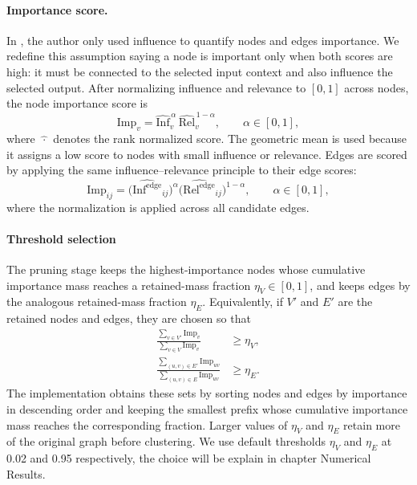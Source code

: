 \documentclass[../main.tex]{subfiles}
\begin{document}
\paragraph{Importance score.}
In \cite{ameisen2025circuit}, the author only used influence to quantify nodes and edges importance. We redefine this assumption saying a node is important only when both scores are high: it must be connected to the
selected input context and also influence the selected output. After normalizing
influence and relevance to $[0,1]$ across nodes, the node importance score is
\begin{equation}
\mathrm{Imp}_v =
\widehat{\mathrm{Inf}}_v^{\,\alpha}\,
\widehat{\mathrm{Rel}}_v^{\,1-\alpha},
\qquad \alpha \in [0,1],
\label{eq:importance}
\end{equation}
where $\widehat{\,\cdot\,}$ denotes the rank normalized score. The geometric mean is
used because it assigns a low score to nodes with small influence or relevance.
Edges are scored by applying the
same influence--relevance principle to their edge scores:
\begin{equation}
\mathrm{Imp}_{ij} =
\bigl(\widehat{\mathrm{Inf}^{\text{edge}}}_{ij}\bigr)^{\alpha}
\bigl(\widehat{\mathrm{Rel}^{\text{edge}}}_{ij}\bigr)^{1-\alpha},
\qquad \alpha \in [0,1],
\label{eq:edge-importance}
\end{equation}
where the normalization is applied across all candidate edges.

\paragraph{Threshold selection}
The pruning stage keeps the highest-importance nodes whose cumulative importance
mass reaches a retained-mass fraction $\eta_V \in [0,1]$, and keeps edges by the
analogous retained-mass fraction $\eta_E$. Equivalently, if $V'$ and $E'$ are the
retained nodes and edges, they are chosen so that
\begin{align}
\frac{\sum_{v \in V'} \mathrm{Imp}_v}
     {\sum_{v \in V} \mathrm{Imp}_v}
&\ge \eta_V, \label{eq:node-retained-mass}\\
\frac{\sum_{(u,v) \in E'} \mathrm{Imp}_{uv}}
     {\sum_{(u,v) \in E} \mathrm{Imp}_{uv}}
&\ge \eta_E. \label{eq:edge-retained-mass}
\end{align}
The implementation obtains these sets by sorting nodes and edges by importance in
descending order and keeping the smallest prefix whose cumulative importance mass
reaches the corresponding fraction. Larger values of $\eta_V$ and $\eta_E$ retain
more of the original graph before clustering. We use default thresholds $\eta_V$ and $\eta_E$ at 0.02 and 0.95 respectively, the choice will be explain in chapter Numerical Results.
\end{document}
